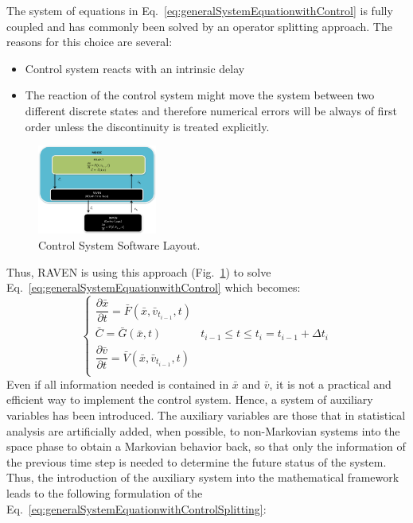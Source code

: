 \documentclass{anstrans}
\begin{document}
The system of equations in Eq.~\ref{eq:generalSystemEquationwithControl} is fully coupled and has commonly been solved by an operator splitting approach. The reasons for this choice are several:
\begin{itemize}
\item Control system reacts with an intrinsic delay
\item The reaction of the control system might move the system between two different discrete states and
therefore numerical errors will be always of first order unless the discontinuity is treated explicitly.
\end{itemize}
\begin{figure}
\centering
\includegraphics[width=0.35\textwidth]{figures/ControlSystemSoftwareLayout.pdf}
\caption{Control System Software Layout.}
\label{fig:ControlSoftwareLayout}
\end{figure}
Thus, RAVEN is using this approach (Fig.~\ref{fig:ControlSoftwareLayout}) to solve Eq.~\ref{eq:generalSystemEquationwithControl} which becomes:
\begin{equation}
\begin{cases} 
\dfrac{\partial \bar{x}}{\partial t} = \bar{F}(\bar{x},\bar{v}_{t_{i-1}},t) \\
\bar{C} = \bar{G}(\bar{x},t) & t_{i-1}\leq t\leq t_{i} = t_{i-1} + \Delta t_{i}\\ 
\dfrac{\partial \bar{v}}{\partial t} = \bar{V}(\bar{x},\bar{v}_{t_{i-1}},t) \\
\end{cases}
\label{eq:generalSystemEquationwithControlSplitting}
\end{equation}
Even if all information needed is contained in $\bar{x}$ and $\bar{v}$, it is not a practical and efficient way to implement the control system. Hence, a system of auxiliary variables has been introduced.
The auxiliary variables are those that in statistical analysis are artificially added, when possible, to non-Markovian systems into the space phase to obtain a Markovian behavior back, so that only the information of the previous time step is needed to determine the future status of the system.
Thus, the introduction of the auxiliary system into the mathematical framework leads to the following formulation of the Eq.~\ref{eq:generalSystemEquationwithControlSplitting}:
\end{document}
